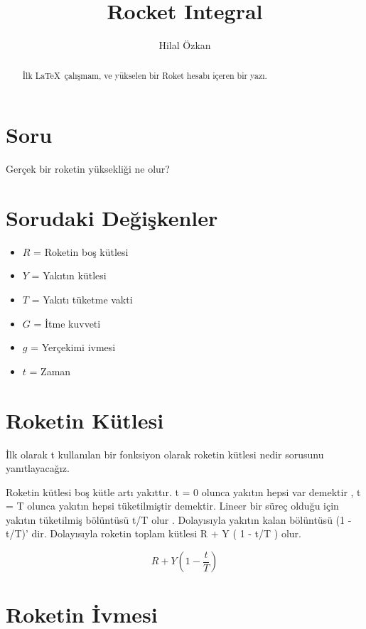 \documentclass[a4paper,10pt]{article}
\title{Rocket Integral}
\author{Hilal Özkan}
\begin{document}
\maketitle

\begin{abstract}

İlk \LaTeX \, çalışmam, ve yükselen bir Roket hesabı içeren bir yazı.

\end{abstract}


 \section{Soru} 
 
 
 Gerçek bir roketin yüksekliği ne olur?

\section{Sorudaki Değişkenler}


\begin{itemize}
 \item $R$ = Roketin boş kütlesi
 \item $Y$ = Yakıtın kütlesi
 \item $T$ = Yakıtı tüketme vakti
 \item $G$ = İtme kuvveti
 \item $g$ = Yerçekimi ivmesi
 \item $t$ = Zaman
\end{itemize}

\section{Roketin Kütlesi}

İlk olarak t kullanılan bir fonksiyon olarak roketin kütlesi nedir sorusunu yanıtlayacağız.


Roketin kütlesi boş kütle artı yakıttır. t = 0 olunca yakıtın hepsi var demektir , t  = T olunca yakıtın hepsi tüketilmiştir demektir. Lineer bir süreç olduğu için yakıtın tüketilmiş bölüntüsü t/T olur . Dolayısıyla yakıtın kalan bölüntüsü  (1 - t/T)' dir.  Dolayısıyla roketin toplam kütlesi R + Y ( 1 - t/T ) olur.

\[ R + Y ( 1 - \frac{t}{T} )\]

\section{Roketin İvmesi}
\end{document}
